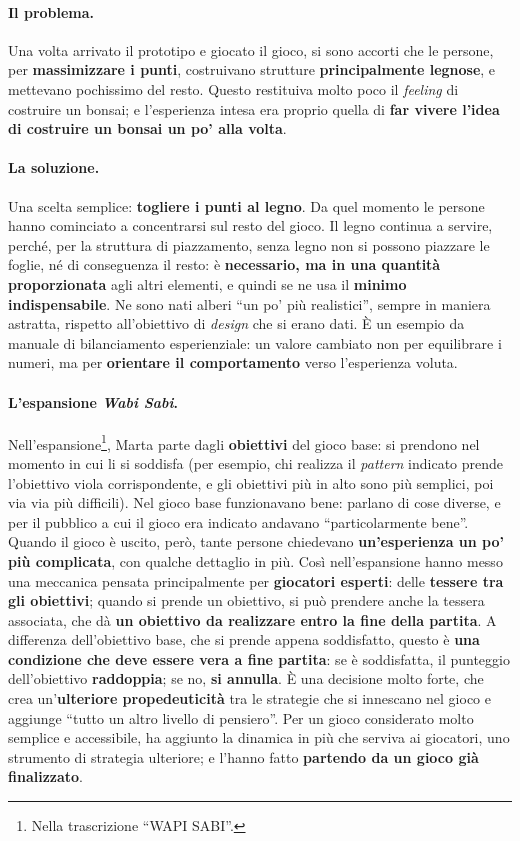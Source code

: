 \paragraph{Il problema.} Una volta arrivato il prototipo e giocato il gioco, si sono accorti che
le persone, per \textbf{massimizzare i punti}, costruivano strutture \textbf{principalmente
legnose}, e mettevano pochissimo del resto. Questo restituiva molto poco il \emph{feeling} di
costruire un bonsai; e l'esperienza intesa era proprio quella di \textbf{far vivere l'idea di
costruire un bonsai un po' alla volta}.

\paragraph{La soluzione.} Una scelta semplice: \textbf{togliere i punti al legno}. Da quel
momento le persone hanno cominciato a concentrarsi sul resto del gioco. Il legno continua a
servire, perché, per la struttura di piazzamento, senza legno non si possono piazzare le foglie,
né di conseguenza il resto: è \textbf{necessario, ma in una quantità proporzionata} agli altri
elementi, e quindi se ne usa il \textbf{minimo indispensabile}. Ne sono nati alberi ``un po' più
realistici'', sempre in maniera astratta, rispetto all'obiettivo di \emph{design} che si erano
dati. È un esempio da manuale di bilanciamento esperienziale: un valore cambiato non per
equilibrare i numeri, ma per \textbf{orientare il comportamento} verso l'esperienza voluta.

\paragraph{L'espansione \emph{Wabi Sabi}.} Nell'espansione\footnote{Nella trascrizione ``WAPI
SABI''.}, Marta parte dagli \textbf{obiettivi} del gioco base: si prendono nel momento in cui li
si soddisfa (per esempio, chi realizza il \emph{pattern} indicato prende l'obiettivo viola
corrispondente, e gli obiettivi più in alto sono più semplici, poi via via più difficili). Nel
gioco base funzionavano bene: parlano di cose diverse, e per il pubblico a cui il gioco era
indicato andavano ``particolarmente bene''. Quando il gioco è uscito, però, tante persone
chiedevano \textbf{un'esperienza un po' più complicata}, con qualche dettaglio in più. Così
nell'espansione hanno messo una meccanica pensata principalmente per \textbf{giocatori
esperti}: delle \textbf{tessere tra gli obiettivi}; quando si prende un obiettivo, si può
prendere anche la tessera associata, che dà \textbf{un obiettivo da realizzare entro la fine
della partita}. A differenza dell'obiettivo base, che si prende appena soddisfatto, questo è
\textbf{una condizione che deve essere vera a fine partita}: se è soddisfatta, il punteggio
dell'obiettivo \textbf{raddoppia}; se no, \textbf{si annulla}. È una decisione molto forte, che
crea un'\textbf{ulteriore propedeuticità} tra le strategie che si innescano nel gioco e
aggiunge ``tutto un altro livello di pensiero''. Per un gioco considerato molto semplice e
accessibile, ha aggiunto la dinamica in più che serviva ai giocatori, uno strumento di
strategia ulteriore; e l'hanno fatto \textbf{partendo da un gioco già finalizzato}.


